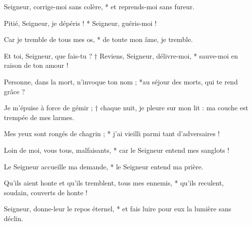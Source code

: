 \item Seigneur, corrige-moi sans colère, * et reprends-moi sans fureur.

\item Pitié, Seigneur, je dépéris ! * Seigneur, guéris-moi !

\item Car je tremble de tous mes os, * de toute mon âme, je tremble.

\item Et toi, Seigneur, que fais-tu ? † Reviens, Seigneur, délivre-moi, * sauve-moi en raison de ton amour !

\item Personne, dans la mort, n'invoque ton nom ; *au séjour des morts, qui te rend grâce ?

\item Je m'épuise à force de gémir ; † chaque nuit, je pleure sur mon lit : ma couche est trempée de mes larmes.

\item Mes yeux sont rongés de chagrin ; * j'ai vieilli parmi tant d'adversaires !

\item Loin de moi, vous tous, malfaisants, * car le Seigneur entend mes sanglots !

\item Le Seigneur accueille ma demande, * le Seigneur entend ma prière.

\item Qu'ils aient honte et qu'ils tremblent, tous mes ennemis, * qu'ils reculent, soudain, couverts de honte !

\item Seigneur, donne-leur le repos éternel, * et fais luire pour eux la lumière sans déclin.
